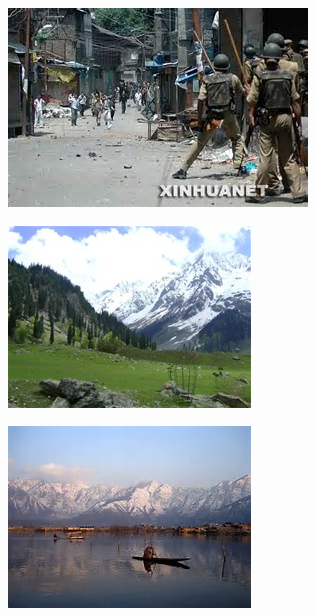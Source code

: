 \begin{figure}[t]
\begin{subfigure}{0.30\columnwidth}
	\end{subfigure}
	\begin{subfigure}{0.30\columnwidth}
		\centering
		\includegraphics[width=\columnwidth]{keshimier3.jpg}
	\end{subfigure}
	\centering
	\begin{subfigure}{0.30\columnwidth}
		\centering
		\includegraphics[width=\columnwidth]{kashmir1.jpg}
	\end{subfigure}
	\begin{subfigure}{0.30\columnwidth}
		\centering
		\includegraphics[width=\columnwidth]{kashmir2.jpg}

\end{subfigure}
\end{figure}
